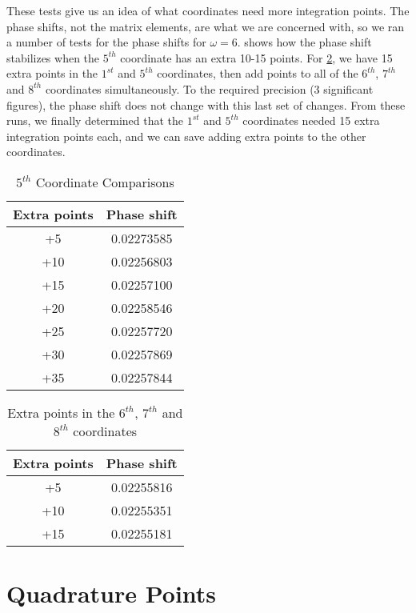 \documentclass[Dissertation.tex]{subfiles}
\begin{document}
These tests give us an idea of what coordinates need more integration points. The phase shifts, not the matrix elements, are what we are concerned with, so we ran a number of tests for the phase shifts for $\omega = 6$.  shows how the phase shift stabilizes when the $5^{th}$ coordinate has an extra 10-15 points. For \cref{tab:678thcoordExtraPoints}, we have 15 extra points in the $1^{st}$ and $5^{th}$ coordinates, then add points to all of the $6^{th}$, $7^{th}$ and $8^{th}$ coordinates simultaneously. To the required precision (3 significant figures), the phase shift does not change with this last set of changes. From these runs, we finally determined that the $1^{st}$ and $5^{th}$ coordinates needed 15 extra integration points each, and we can save adding extra points to the other coordinates.

\begin{table}
\centering
\begin{tabular}{c c}
\toprule
Extra points & Phase shift \\
\midrule
+5 & 0.02273585 \\
+10 & 0.02256803 \\
+15 & 0.02257100 \\
+20 & 0.02258546 \\
+25 & 0.02257720 \\
+30 & 0.02257869 \\
+35 & 0.02257844 \\
\bottomrule
\end{tabular}
\caption{$5^{th}$ Coordinate Comparisons}
\label{tab:5thcoordExtraPoints}
\end{table}


\begin{table}
\centering
\begin{tabular}{c c}
\toprule
Extra points & Phase shift \\
\midrule
+5 & 0.02255816 \\
+10 & 0.02255351 \\
+15 & 0.02255181 \\
\bottomrule
\end{tabular}
\caption{Extra points in the $6^{th}$, $7^{th}$ and $8^{th}$ coordinates}
\label{tab:678thcoordExtraPoints}
\end{table}



\section{Quadrature Points}
\label{sec:QuadraturePoints}
\end{document}

